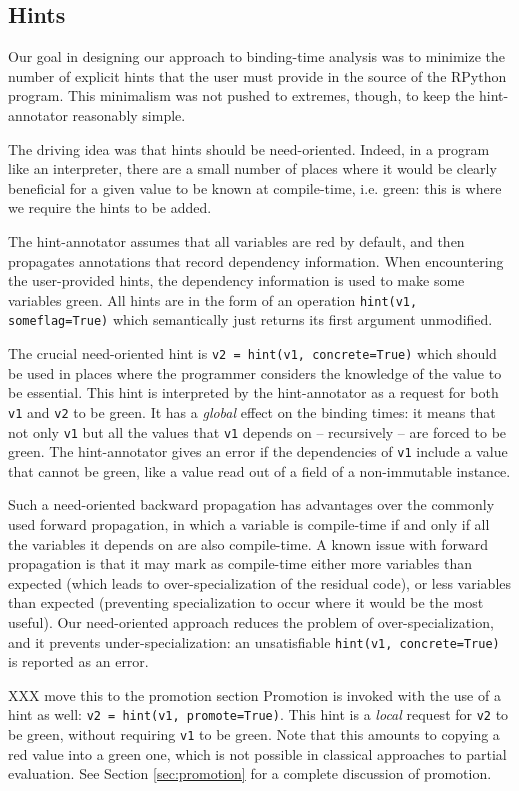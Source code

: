 \subsection{Hints}
\label{sec:hints}

Our goal in designing our approach to binding-time analysis was to
minimize the number of explicit hints that the user must provide in
the source of the RPython program.  This minimalism was not pushed to
extremes, though, to keep the hint-annotator reasonably simple.  

The driving idea was that hints should be need-oriented.  Indeed, in a
program like an interpreter, there are a small number of places where it
would be clearly beneficial for a given value to be known at
compile-time, i.e. green: this is where we require the hints to be
added.

The hint-annotator assumes that all variables are red by default, and
then propagates annotations that record dependency information.
When encountering the user-provided hints, the dependency information
is used to make some variables green.  All
hints are in the form of an operation \texttt{hint(v1, someflag=True)}
which semantically just returns its first argument unmodified.

The crucial need-oriented hint is \texttt{v2 = hint(v1, concrete=True)}
which should be used in places where the programmer considers the
knowledge of the value to be essential.  This hint is interpreted by
the hint-annotator as a request for both \texttt{v1} and \texttt{v2} to be green.  It
has a \emph{global} effect on the binding times: it means that not only
\texttt{v1} but all the values that \texttt{v1} depends on – recursively –
are forced to be green.  The hint-annotator gives an error if the
dependencies of \texttt{v1} include a value that cannot be green, like
a value read out of a field of a non-immutable instance.

Such a need-oriented backward propagation has advantages over the
commonly used forward propagation, in which a variable is compile-time
if and only if all the variables it depends on are also compile-time.  A
known issue with forward propagation is that it may mark as compile-time
either more variables than expected (which leads to over-specialization
of the residual code), or less variables than expected (preventing
specialization to occur where it would be the most useful).  Our
need-oriented approach reduces the problem of over-specialization, and
it prevents under-specialization: an unsatisfiable \texttt{hint(v1,
concrete=True)} is reported as an error.

XXX move this to the promotion section
Promotion is invoked with the use of a hint as well:
\texttt{v2 = hint(v1, promote=True)}.
This hint is a \emph{local} request for \texttt{v2} to be green, without
requiring \texttt{v1} to be green.  Note that this amounts to copying
a red value into a green one, which is not possible in classical
approaches to partial evaluation.  See Section \ref{sec:promotion} for a
complete discussion of promotion.


